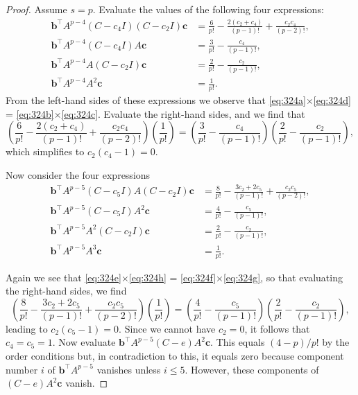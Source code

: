 \begin{proof}
Assume $s = p$. Evaluate the values of the following four expressions:
\begin{align}
\mathbf{b}^\top A^{p-4} (C - c_4 I)(C - c_2 I)\mathbf{c} &= \frac{6}{p!} - \frac{2(c_2 + c_4)}{(p-1)!} + \frac{c_2 c_4}{(p-2)!}, \label{eq:324a} \\
\mathbf{b}^\top A^{p-4} (C - c_4 I)A\mathbf{c} &= \frac{3}{p!} - \frac{c_4}{(p-1)!}, \label{eq:324b} \\
\mathbf{b}^\top A^{p-4} A(C - c_2 I)\mathbf{c} &= \frac{2}{p!} - \frac{c_2}{(p-1)!}, \label{eq:324c} \\
\mathbf{b}^\top A^{p-4} A^2 \mathbf{c} &= \frac{1}{p!}. \label{eq:324d}
\end{align}
From the left-hand sides of these expressions we observe that \eqref{eq:324a}$\times$\eqref{eq:324d} = \eqref{eq:324b}$\times$\eqref{eq:324c}. Evaluate the right-hand sides, and we find that
\[
\left( \frac{6}{p!} - \frac{2(c_2 + c_4)}{(p-1)!} + \frac{c_2 c_4}{(p-2)!} \right) \left( \frac{1}{p!} \right) = \left( \frac{3}{p!} - \frac{c_4}{(p-1)!} \right) \left( \frac{2}{p!} - \frac{c_2}{(p-1)!} \right),
\]
which simplifies to $c_2 (c_4 - 1) = 0$.

Now consider the four expressions
\begin{align}
\mathbf{b}^\top A^{p-5} (C - c_5 I)A(C - c_2 I)\mathbf{c} &= \frac{8}{p!} - \frac{3c_2 + 2c_5}{(p-1)!} + \frac{c_2 c_5}{(p-2)!}, \label{eq:324e} \\
\mathbf{b}^\top A^{p-5} (C - c_5 I)A^2 \mathbf{c} &= \frac{4}{p!} - \frac{c_5}{(p-1)!}, \label{eq:324f} \\
\mathbf{b}^\top A^{p-5} A^2 (C - c_2 I)\mathbf{c} &= \frac{2}{p!} - \frac{c_2}{(p-1)!}, \label{eq:324g} \\
\mathbf{b}^\top A^{p-5} A^3 \mathbf{c} &= \frac{1}{p!}. \label{eq:324h}
\end{align}

Again we see that \eqref{eq:324e}$\times$\eqref{eq:324h} = \eqref{eq:324f}$\times$\eqref{eq:324g}, so that evaluating the right-hand sides, we find
\[
\left( \frac{8}{p!} - \frac{3c_2 + 2c_5}{(p-1)!} + \frac{c_2 c_5}{(p-2)!} \right) \left( \frac{1}{p!} \right) = \left( \frac{4}{p!} - \frac{c_5}{(p-1)!} \right) \left( \frac{2}{p!} - \frac{c_2}{(p-1)!} \right),
\]
leading to $c_2 (c_5 - 1) = 0$. Since we cannot have $c_2 = 0$, it follows that $c_4 = c_5 = 1$. Now evaluate $\mathbf{b}^\top A^{p-5} (C - e)A^2 \mathbf{c}$. This equals $(4 - p)/p!$ by the order conditions but, in contradiction to this, it equals zero because component number $i$ of $\mathbf{b}^\top A^{p-5}$ vanishes unless $i \leq 5$. However, these components of $(C - e)A^2 \mathbf{c}$ vanish.


\end{proof}
